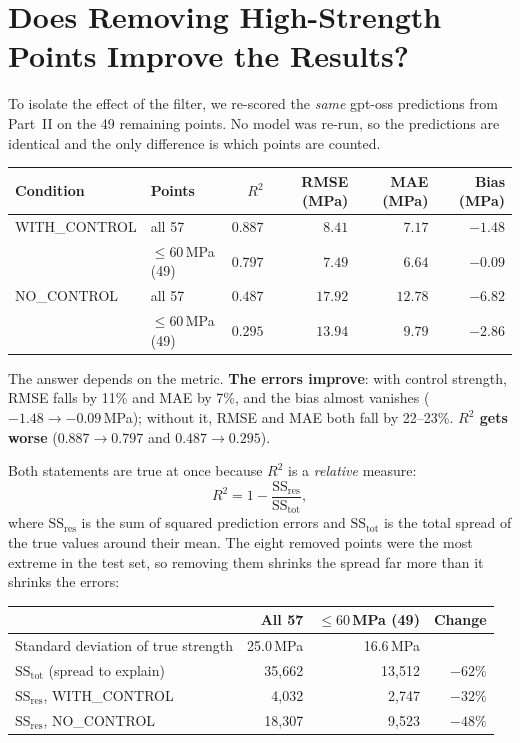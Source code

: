 \documentclass[11pt]{article}
\newcommand{\R}{$R^2$}
\begin{document}
\section{Does Removing High-Strength Points Improve the Results?}
\label{sec:part3-filter}
To isolate the effect of the filter, we re-scored the \emph{same} gpt-oss predictions
from Part~II on the 49 remaining points. No model was re-run, so the predictions are
identical and the only difference is which points are counted.

\begin{center}\small
\begin{tabular}{llrrrr}
\toprule
Condition & Points & \R{} & RMSE (MPa) & MAE (MPa) & Bias (MPa) \\
\midrule
WITH\_CONTROL & all 57 & $0.887$ & $8.41$ & $7.17$ & $-1.48$ \\
              & $\leq60$\,MPa (49) & $0.797$ & $\mathbf{7.49}$ & $\mathbf{6.64}$ & $\mathbf{-0.09}$ \\
\midrule
NO\_CONTROL   & all 57 & $0.487$ & $17.92$ & $12.78$ & $-6.82$ \\
              & $\leq60$\,MPa (49) & $0.295$ & $\mathbf{13.94}$ & $\mathbf{9.79}$ & $\mathbf{-2.86}$ \\
\bottomrule
\end{tabular}
\end{center}

\noindent The answer depends on the metric. \textbf{The errors improve}: with control
strength, RMSE falls by 11\% and MAE by 7\%, and the bias almost vanishes
($-1.48\to-0.09$\,MPa); without it, RMSE and MAE both fall by 22--23\%. \textbf{\R{}
gets worse} ($0.887\to0.797$ and $0.487\to0.295$).

Both statements are true at once because \R{} is a \emph{relative} measure:
\[
R^2 = 1-\frac{\text{SS}_\text{res}}{\text{SS}_\text{tot}},
\]
where $\text{SS}_\text{res}$ is the sum of squared prediction errors and
$\text{SS}_\text{tot}$ is the total spread of the true values around their mean. The
eight removed points were the most extreme in the test set, so removing them shrinks
the spread far more than it shrinks the errors:

\begin{center}\small
\begin{tabular}{lrrr}
\toprule
 & All 57 & $\leq60$\,MPa (49) & Change \\
\midrule
Standard deviation of true strength & 25.0\,MPa & 16.6\,MPa & \\
$\text{SS}_\text{tot}$ (spread to explain) & 35{,}662 & 13{,}512 & $-62\%$ \\
$\text{SS}_\text{res}$, WITH\_CONTROL & 4{,}032 & 2{,}747 & $-32\%$ \\
$\text{SS}_\text{res}$, NO\_CONTROL & 18{,}307 & 9{,}523 & $-48\%$ \\
\bottomrule
\end{tabular}
\end{center}
\end{document}

